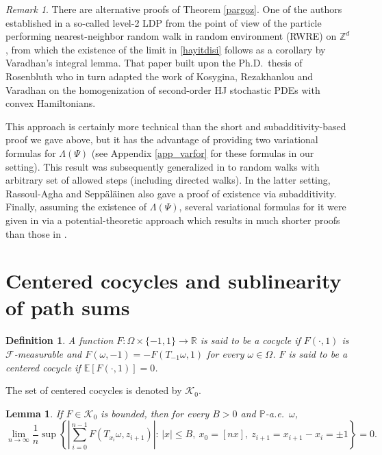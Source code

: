 \documentclass[a4paper]{amsart}
\numberwithin{equation}{section}
\theoremstyle{plain}
\newtheorem{definition}[theorem]{\sc Definition}
\newtheorem{lemma}[theorem]{\sc Lemma}
\theoremstyle{remark}
\newtheorem{remark}[theorem]{\sc Remark}
\begin{document}
\begin{remark}\label{furrefvar}
	There are alternative proofs of Theorem \ref{pargoz}. One of the authors established in \cite{Yil2009} a so-called level-2 LDP from the point of view of the particle performing nearest-neighbor random walk in random environment (RWRE) on $\mathbb{Z}^d$, from which the existence of the limit in \eqref{hayitdisi} follows as a corollary by Varadhan's integral lemma. That 
	paper built upon the Ph.D.\ thesis of Rosenbluth \cite{Ros2006} who in turn adapted the work of Kosygina, Rezakhanlou and Varadhan \cite{KosRezVar2006} on the homogenization of second-order HJ stochastic PDEs 
	with convex Hamiltonians.
	
	This approach is certainly more technical than the short and subadditivity-based proof we gave above, but it has the advantage of providing two variational formulas for $\Lambda(\Psi)$ (see Appendix \ref{app_varfor} for these formulas in our setting). This result was subsequently generalized in \cite{RasSepYil2013} to random walks with arbitrary set of allowed steps (including directed walks). In the latter setting, Rassoul-Agha and Sepp\"al\"ainen \cite{RasSep2014} also gave a proof of existence via subadditivity. Finally, assuming the existence of $\Lambda(\Psi)$, several variational formulas for it were given in \cite{RasSepYil2017} via a potential-theoretic approach which results in much shorter proofs than those in \cite{Ros2006, Yil2009, RasSepYil2013}.
\end{remark}

\section{Centered cocycles and sublinearity of path sums}\label{app_cocycle}

\begin{definition}\label{cencocdef}
A function $F:\Omega\times\{-1,1\}\to\mathbb{R}$ is said to be a cocycle if $F(\cdot,1)$ is $\mathcal{F}$-measurable and $F(\omega,-1) = -F(T_{-1}\omega,1)$ for every $\omega\in\Omega$. $F$ is said to be a centered cocycle if $\mathbb{E}[F(\cdot,1)] = 0$.
\end{definition}
{}{The set of centered cocycles is denoted by $\mathcal{K}_0$.}

\begin{lemma}\label{cencoclem}
  If {}{$F\in \mathcal{K}_0$} is  bounded, then for every $B>0$ and $\mathbb{P}$-a.e.\ $\omega$,
$$\lim_{n\to\infty}\frac1{n}\sup\left\{\left|\sum_{i=0}^{n-1}F(T_{x_i}\omega,z_{i+1})\right|:\, |x|\le B,\ x_0 = [nx],\ z_{i+1} = x_{i+1} - x_i = \pm1\right\} = 0.$$
\end{lemma}
\end{document}
